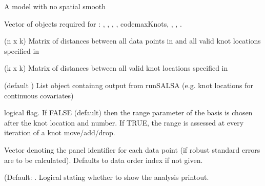 \documentclass[a4paper]{book}
\begin{document}
\begin{Arguments}
\begin{ldescription}
\item[\code{model}] A model with no spatial smooth

\item[\code{salsa2dlist}] Vector of objects required for : , , , , codemaxKnots, , , .

\item[\code{d2k}] (n x k) Matrix of distances between all data points in  and all valid knot locations specified in 

\item[\code{k2k}] (k x k) Matrix of distances between all valid knot locations specified in 

\item[\code{splineParams}] (default ) List object containng output from runSALSA (e.g. knot locations for continuous covariates)

\item[\code{chooserad}] logical flag.  If FALSE (default) then the range parameter of the basis is chosen after the knot location and number. If TRUE, the range is assessed at every iteration of a knot move/add/drop.

\item[\code{panels}] Vector denoting the panel identifier for each data point (if robust standard errors are to be calculated). Defaults to data order index if not given.

\item[\code{suppress.printout}] (Default: . Logical stating whether to show the analysis printout.
\end{ldescription}
\end{Arguments}
%
\end{document}
